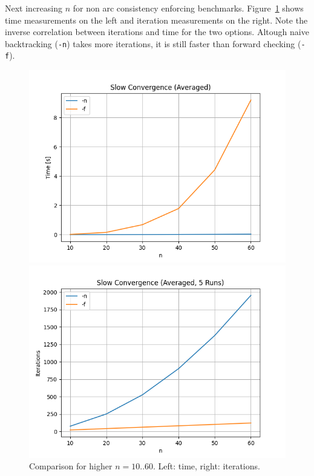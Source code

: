 Next increasing $n$ for non arc consistency enforcing benchmarks. Figure~\ref{fig:slow:sidebyside} shows time measurements on the left and iteration measurements on the right. Note the inverse correlation between iterations and time for the two options. Altough naive backtracking (\verb|-n|) takes more iterations, it is still faster than forward checking (\verb|-f|).

\begin{figure}[ht]
	\centering
	\begin{minipage}{0.49\textwidth}
		\centering
		\includegraphics[width=\textwidth]{./Problems/slow_convergence/plots/time.png}
	\end{minipage}
	\hfill
	\begin{minipage}{0.49\textwidth}
		\centering
		\includegraphics[width=\textwidth]{./Problems/slow_convergence/plots/iterations.png}
	\end{minipage}
	\caption{Comparison for higher $n = 10..60$. Left: time, right: iterations.}
	\label{fig:slow:sidebyside}
\end{figure}

